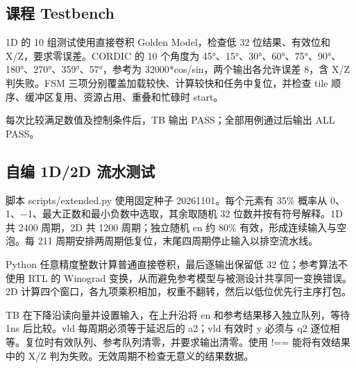 \documentclass[
  10pt,
  a4paper,
]{article}
\begin{document}
\subsection{课程 Testbench}\label{ux8bfeux7a0b-testbench}

1D 的 10 组测试使用直接卷积 Golden Model，检查低 32 位结果、有效位和
X/Z，要求零误差。CORDIC 的 10 个角度为
45°、15°、30°、60°、75°、90°、180°、270°、359°、57°，参考为
32000*cos/sin，两个输出各允许误差 8，含 X/Z 判失败。FSM
三项分别覆盖加载较快、计算较快和任务中复位，并检查 tile
顺序、缓冲区复用、资源占用、重叠和忙碌时 start。

每次比较满足数值及控制条件后，TB 输出 PASS；全部用例通过后输出 ALL
PASS。

\subsection{自编 1D/2D
流水测试}\label{ux81eaux7f16-1d2d-ux6d41ux6c34ux6d4bux8bd5}

脚本 scripts/extended.py 使用固定种子 20261101。每个元素有 35\% 概率从
0、1、−1、最大正数和最小负数中选取，其余取随机 32 位数并按有符号解释。1D
共 2400 周期，2D 共 1200 周期；独立随机 en 约 80\%
有效，形成连续输入与空泡。每 211
周期安排两周期低复位，末尾四周期停止输入以排空流水线。

Python 任意精度整数计算普通直接卷积，最后逐输出保留低 32
位；参考算法不使用 RTL 的 Winograd
变换，从而避免参考模型与被测设计共享同一变换错误。2D
计算四个窗口，各九项乘积相加，权重不翻转，然后以低位优先行主序打包。

TB 在下降沿读向量并设置输入，在上升沿将 en 和参考结果移入独立队列，等待
1ns 后比较。vld 每周期必须等于延迟后的 a2；vld 有效时 y 必须与 q2
逐位相等。复位时有效队列、参考队列清零，并要求输出清零。使用 !==
能将有效结果中的 X/Z 判为失败。无效周期不检查无意义的结果数据。
\end{document}

